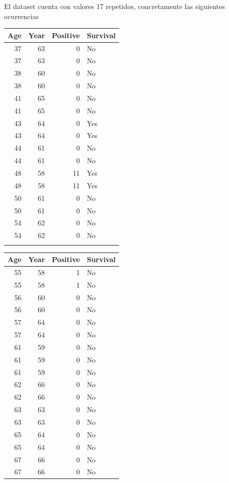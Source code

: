 El dataset cuenta con valores 17 repetidos, concretamente las siguientes ocurrencias

\begin{tabular}{r|r|r|l}
\hline
Age & Year & Positive & Survival\\
\hline
37 & 63 & 0 & No\\
\hline
37 & 63 & 0 & No\\
\hline
38 & 60 & 0 & No\\
\hline
38 & 60 & 0 & No\\
\hline
41 & 65 & 0 & No\\
\hline
41 & 65 & 0 & No\\
\hline
43 & 64 & 0 & Yes\\
\hline
43 & 64 & 0 & Yes\\
\hline
44 & 61 & 0 & No\\
\hline
44 & 61 & 0 & No\\
\hline
48 & 58 & 11 & Yes\\
\hline
48 & 58 & 11 & Yes\\
\hline
50 & 61 & 0 & No\\
\hline
50 & 61 & 0 & No\\
\hline
54 & 62 & 0 & No\\
\hline
54 & 62 & 0 & No\\
\hline
& & &\\
\hline
\end{tabular}
\begin{tabular}{r|r|r|l}
\hline
Age & Year & Positive & Survival\\
\hline
55 & 58 & 1 & No\\
\hline
55 & 58 & 1 & No\\
\hline
56 & 60 & 0 & No\\
\hline
56 & 60 & 0 & No\\
\hline
57 & 64 & 0 & No\\
\hline
57 & 64 & 0 & No\\
\hline
61 & 59 & 0 & No\\
\hline
61 & 59 & 0 & No\\
\hline
61 & 59 & 0 & No\\
\hline
62 & 66 & 0 & No\\
\hline
62 & 66 & 0 & No\\
\hline
63 & 63 & 0 & No\\
\hline
63 & 63 & 0 & No\\
\hline
65 & 64 & 0 & No\\
\hline
65 & 64 & 0 & No\\
\hline
67 & 66 & 0 & No\\
\hline
67 & 66 & 0 & No\\
\hline
\end{tabular}

